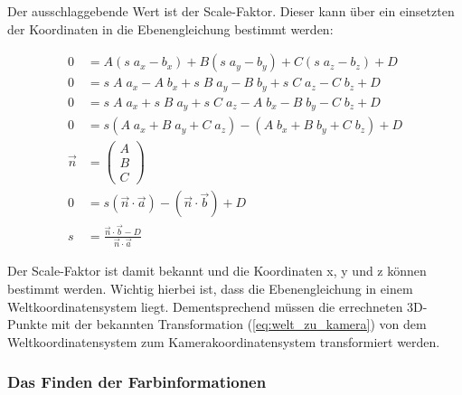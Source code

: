 	Der ausschlaggebende Wert ist der Scale-Faktor. Dieser kann über ein einsetzten der Koordinaten in die Ebenengleichung bestimmt werden:
	
	\begin{equation}
		\begin{aligned}
			0 &= A(s \; a_x - b_x) + B(s \; a_y - b_y) + C(s \; a_z - b_z) + D \\
			0 &= s \; A \; a_x - A \; b_x + s \; B \; a_y - B \; b_y + s \; C \; a_z - C \; b_z + D \\
			0 &= s \; A \; a_x + s \; B \; a_y + s \; C \; a_z - A \; b_x - B \; b_y - C \; b_z + D \\
			0 &= s(A \; a_x + B \; a_y + C \; a_z) - (A \; b_x + B \; b_y + C \; b_z) + D \\
			\vec{n} &= \begin{pmatrix}
			A \\
			B \\
			C
			\end{pmatrix} \\
			0 &= s(\vec{n} \cdot \vec{a}) - (\vec{n} \cdot \vec{b}) + D \\
			s &= \frac{\vec{n} \cdot \vec{b} - D}{\vec{n} \cdot \vec{a}}
		\end{aligned}
	\end{equation}
	
	Der Scale-Faktor ist damit bekannt und die Koordinaten x, y und z können bestimmt werden. Wichtig hierbei ist, dass die Ebenengleichung in einem Weltkoordinatensystem liegt. Dementsprechend müssen die errechneten 3D-Punkte mit der bekannten Transformation (\ref{eq:welt_zu_kamera}) von dem Weltkoordinatensystem zum Kamerakoordinatensystem transformiert werden.
	
	\subsubsection{Das Finden der Farbinformationen}
	
